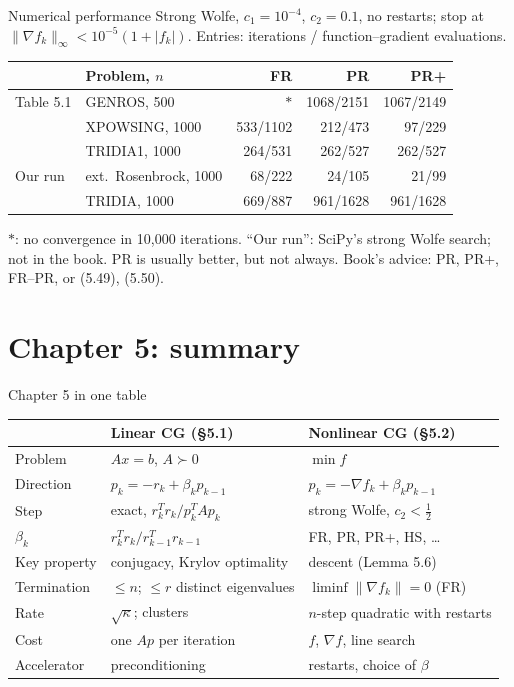 \documentclass[12pt,aspectratio=169]{beamer}
\begin{document}
\begin{frame}{Numerical performance}
  Strong Wolfe, $c_1=10^{-4}$, $c_2=0.1$, no restarts; stop at $\|\nabla f_k\|_\infty<10^{-5}(1+|f_k|)$.
  Entries: iterations / function--gradient evaluations.

  \vspace{1ex}
  \centering
  \renewcommand{\arraystretch}{1.08}
  \begin{tabular}{llrrr}
    \toprule
    & Problem, $n$ & FR & PR & PR+\\
    \midrule
    Table 5.1 & GENROS, 500 & $*$ & 1068/2151 & 1067/2149\\
    & XPOWSING, 1000 & 533/1102 & 212/473 & 97/229\\
    & TRIDIA1, 1000 & 264/531 & 262/527 & 262/527\\
    \midrule
    Our run & ext.\ Rosenbrock, 1000 & 68/222 & 24/105 & 21/99\\
    & TRIDIA, 1000 & 669/887 & 961/1628 & 961/1628\\
    \bottomrule
  \end{tabular}

  \raggedright
  \vspace{1ex}
  $*$: no convergence in 10{,}000 iterations. ``Our run'': SciPy's strong Wolfe search; not in the book.
  PR is usually better, but not always. Book's advice: PR, PR+, FR--PR, or (5.49), (5.50).
\end{frame}

\section{Chapter 5: summary}

\begin{frame}{Chapter 5 in one table}
  \centering
  \renewcommand{\arraystretch}{1.1}
  \begin{tabular}{lll}
    \toprule
    & Linear CG (\S5.1) & Nonlinear CG (\S5.2)\\
    \midrule
    Problem & $Ax=b$, $A\succ0$ & $\min f$\\
    Direction & $p_k=-r_k+\beta_kp_{k-1}$ & $p_k=-\nabla f_k+\beta_kp_{k-1}$\\
    Step & exact, $r_k^Tr_k/p_k^TAp_k$ & strong Wolfe, $c_2<\tfrac12$\\
    $\beta_k$ & $r_k^Tr_k/r_{k-1}^Tr_{k-1}$ & FR, PR, PR+, HS, \dots\\
    Key property & conjugacy, Krylov optimality & descent (Lemma 5.6)\\
    Termination & $\le n$; $\le r$ distinct eigenvalues & $\liminf\|\nabla f_k\|=0$ (FR)\\
    Rate & $\sqrt\kappa$; clusters & $n$-step quadratic with restarts\\
    Cost & one $Ap$ per iteration & $f$, $\nabla f$, line search\\
    Accelerator & preconditioning & restarts, choice of $\beta$\\
    \bottomrule
  \end{tabular}
\end{frame}
\end{document}
